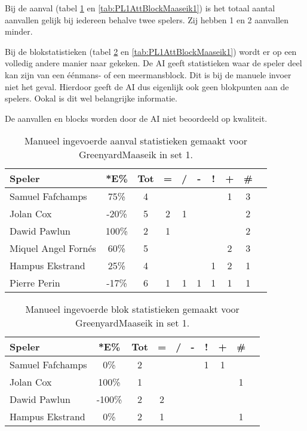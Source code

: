 Bij de aanval (tabel \ref{tab:PL1AttMaaseikMan1} en \ref{tab:PL1AttBlockMaaseik1}) is het totaal aantal aanvallen gelijk bij iedereen behalve twee spelers. Zij hebben 1 en 2 aanvallen minder.

Bij de blokstatistieken (tabel \ref{tab:PL1BlockMaaseikMan1} en \ref{tab:PL1AttBlockMaaseik1}) wordt er op een volledig andere manier naar gekeken. De AI geeft statistieken waar de speler deel kan zijn van een éénmans- of een meermansblock. Dit is bij de manuele invoer niet het geval. Hierdoor geeft de AI dus eigenlijk ook geen blokpunten aan de spelers. Ookal is dit wel belangrijke informatie.

De aanvallen en blocks worden door de AI niet beoordeeld op kwaliteit.

\begin{table}[ht!]
    \centering
    \scriptsize
    \begin{tabular}{|l|c|c|c|c|c|c|c|c|c|}
        \hline
        \textbf{Speler} & *E\% & Tot & = & / & - & ! & + & \# \\ \hline
        Samuel Fafchamps & 75\% & 4 &  &  &  &  & 1 & 3 \\ 
        Jolan Cox & -20\% & 5 & 2 & 1 &  &  &  & 2 \\ 
        Dawid Pawlun  & 100\% & 2 & 1 &  &  &  &  & 2 \\ 
        Miquel Angel Fornés & 60\% & 5 &  &  &  &  & 2 & 3 \\
        Hampus Ekstrand & 25\% & 4 &  &  &  & 1 & 2 & 1 \\ 
        Pierre Perin & -17\% & 6 & 1 & 1 & 1 & 1 & 1 & 1 \\ \hline
    \end{tabular}
    \caption[Manueel ingevoerde aanvalsstatistieken gemaakt Greenyard Maaseik in set 1]{\label{tab:PL1AttMaaseikMan1}Manueel ingevoerde aanval statistieken gemaakt voor GreenyardMaaseik in set 1.}
\end{table}

\begin{table}[ht!]
    \centering
    \scriptsize
    \begin{tabular}{|l|c|c|c|c|c|c|c|c|c|}
        \hline
        \textbf{Speler} & *E\% & Tot & = & / & - & ! & + & \# \\ \hline
        Samuel Fafchamps & 0\% & 2 &  &  &  & 1 & 1 &  \\ 
        Jolan Cox & 100\% & 1 &  &  &  &  &  & 1 \\ 
        Dawid Pawlun & -100\% & 2 & 2 &  &  &  &  &  \\ 
        Hampus Ekstrand & 0\% & 2 & 1 &  &  &  &  & 1 \\ \hline
    \end{tabular}
    \caption[Manueel ingevoerde blokstatistieken gemaakt Greenyard Maaseik in set 1]{\label{tab:PL1BlockMaaseikMan1}Manueel ingevoerde blok statistieken gemaakt voor GreenyardMaaseik in set 1.}
\end{table}

